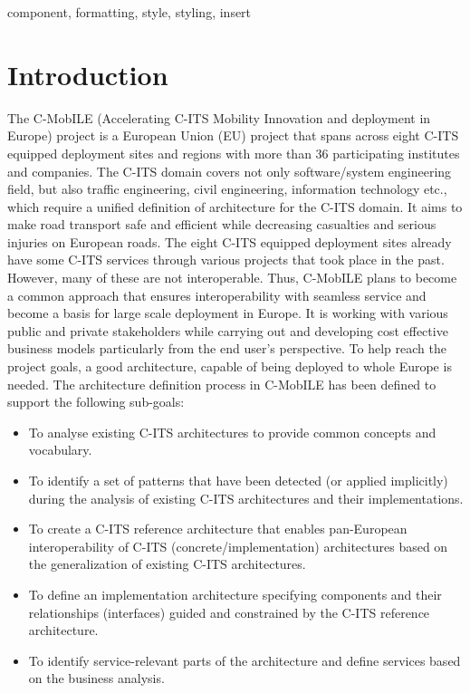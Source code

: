 \documentclass[conference]{IEEEtran}
\begin{document}
\begin{IEEEkeywords}
component, formatting, style, styling, insert
\end{IEEEkeywords}

\section{Introduction}

The C-MobILE (Accelerating C-ITS Mobility Innovation and deployment in Europe) project is a European Union (EU) project that spans across eight C-ITS equipped deployment sites and regions with more than 36 participating institutes and companies. The C-ITS domain covers not only software/system engineering field, but also traffic engineering, civil engineering, information technology etc., which require a unified definition of architecture for the C-ITS domain. It aims to make road transport safe and efficient while decreasing casualties and serious injuries on European roads. The eight C-ITS equipped deployment sites already have some C-ITS services through various projects that took place in the past. However, many of these are not interoperable. Thus, C-MobILE plans to become a common approach that ensures interoperability with seamless service and become a basis for large scale deployment in Europe. It is working with various public and private stakeholders while carrying out and developing cost effective business models particularly from the end user’s perspective. To help reach the project goals, a good architecture, capable of being deployed to whole Europe is needed. The architecture definition process in C-MobILE has been defined to support the following sub-goals:

\begin{itemize}
	\item To analyse existing C-ITS architectures to provide common concepts and vocabulary.
	\item To identify a set of patterns that have been detected (or applied implicitly) during the analysis of existing C-ITS architectures and their implementations.
	\item To create a C-ITS reference architecture that enables pan-European interoperability of C-ITS (concrete/implementation) architectures based on the generalization of existing C-ITS architectures.
	\item To define an implementation architecture specifying components and their relationships (interfaces) guided and constrained by the C-ITS reference architecture.
	\item To identify service-relevant parts of the architecture and define services based on the business analysis.
\end{itemize}
 
\end{document}

